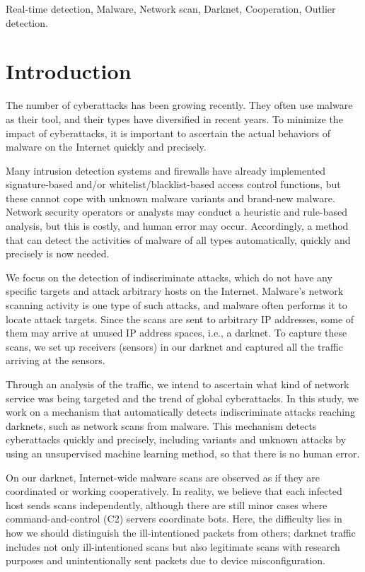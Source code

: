 \documentclass[conference]{IEEEtran}
\begin{document}
\begin{IEEEkeywords}
Real-time detection, Malware, Network scan, Darknet, Cooperation, Outlier detection.
\end{IEEEkeywords}


\section{Introduction}
\label{Introduction}
The number of cyberattacks has been growing recently.
They often use malware as their tool, and their types have diversified in recent years.
To minimize the impact of cyberattacks, it is important to ascertain the actual behaviors of malware on the Internet quickly and precisely.

Many intrusion detection systems and firewalls have already implemented signature-based and/or whitelist/blacklist-based access control functions, but these cannot cope with unknown malware variants and brand-new malware.
Network security operators or analysts may conduct a heuristic and rule-based analysis, but this is costly, and human error may occur.
Accordingly, a method that can detect the activities of malware of all types automatically, quickly and precisely is now needed.

We focus on the detection of indiscriminate attacks, which do not have any specific targets and attack arbitrary hosts on the Internet.
Malware's network scanning activity is one type of such attacks, and malware often performs it to locate attack targets.
Since the scans are sent to arbitrary IP addresses, some of them may arrive at unused IP address spaces, i.e., a darknet.
To capture these scans, we set up receivers (sensors) in our darknet and captured all the traffic arriving at the sensors.

Through an analysis of the traffic, we intend to ascertain what kind of network service was being targeted and the trend of global cyberattacks.
In this study, we work on a mechanism that automatically detects indiscriminate attacks reaching darknets, such as network scans from malware.
This mechanism detects cyberattacks quickly and precisely, including variants and unknown attacks by using an unsupervised machine learning method, so that there is no human error.


On our darknet, Internet-wide malware scans are observed as if they are coordinated or working cooperatively.
In reality, we believe that each infected host sends scans independently, although there are still minor cases where command-and-control (C2) servers coordinate bots.
Here, the difficulty lies in how we should distinguish the ill-intentioned packets from others; darknet traffic includes not only ill-intentioned scans but also legitimate scans with research purposes and unintentionally sent packets due to device misconfiguration.
\end{document}
